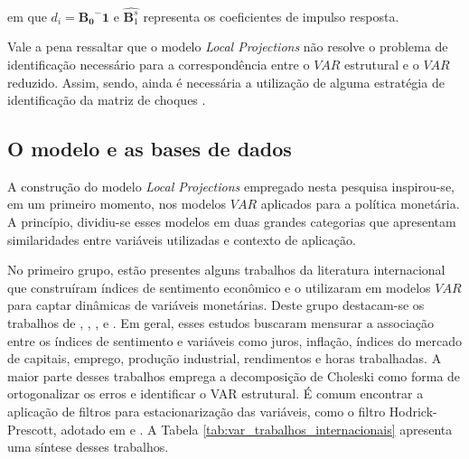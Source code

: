 em que \(d_i = \mathbf{{B_0}^-1}\) e \(\hat{\mathbf{B}_1^s}\) representa os coeficientes de impulso resposta. 

Vale a pena ressaltar que o modelo \textit{Local Projections} não resolve o problema de identificação necessário para a correspondência entre o \(VAR\) estrutural e o \(VAR\) reduzido. Assim, sendo, ainda é necessária a utilização de alguma estratégia de identificação da matriz de choques \parencite{adammer_lpirfs_2019}.


\subsection{O modelo e as bases de dados}

A construção do modelo \textit{Local Projections} empregado nesta pesquisa inspirou-se, em um primeiro momento, nos modelos \(VAR\) aplicados para a política monetária. A princípio, dividiu-se esses modelos em duas grandes categorias que apresentam similaridades entre variáveis utilizadas e contexto de aplicação. 

No primeiro grupo, estão presentes alguns trabalhos da literatura internacional que construíram índices de sentimento econômico e o utilizaram em modelos \(VAR\) para captar dinâmicas de variáveis monetárias. Deste grupo destacam-se os trabalhos de \textcite{bloom_impact_2009}, \textcite{lucca_measuring_2009}, \textcite{haddow_macroeconomic_2013}, \textcite{baker_measuring_2016} e \textcite{nyman_news_2021}. Em geral, esses estudos buscaram mensurar a associação entre os índices de sentimento e variáveis como juros, inflação, índices do mercado de capitais, emprego, produção industrial, rendimentos e horas trabalhadas. A maior parte desses trabalhos emprega a decomposição de Choleski como forma de ortogonalizar os erros e identificar o VAR estrutural. É comum encontrar a aplicação de filtros para estacionarização das variáveis, como o filtro Hodrick-Prescott, adotado em \textcite{bloom_impact_2009} e \textcite{haddow_macroeconomic_2013}. A Tabela \ref{tab:var_trabalhos_internacionais} apresenta uma síntese desses trabalhos. 

